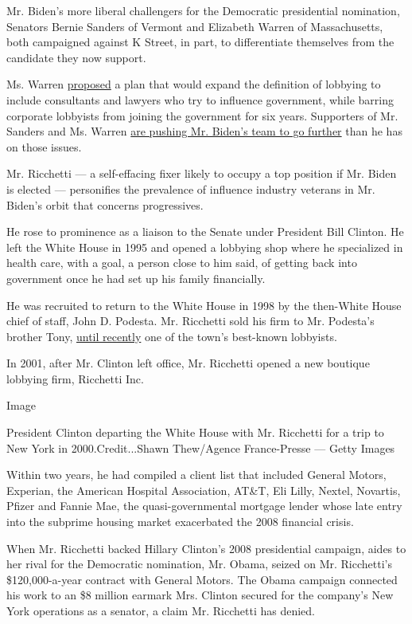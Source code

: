 Mr. Biden's more liberal challengers for the Democratic presidential
nomination, Senators Bernie Sanders of Vermont and Elizabeth Warren of
Massachusetts, both campaigned against K Street, in part, to
differentiate themselves from the candidate they now support.

Ms. Warren
\href{https://medium.com/@teamwarren/my-plan-to-end-washington-corruption-554c7f01aaa5}{proposed}
a plan that would expand the definition of lobbying to include
consultants and lawyers who try to influence government, while barring
corporate lobbyists from joining the government for six years.
Supporters of Mr. Sanders and Ms. Warren
\href{https://www.politico.com/news/2020/07/30/joe-biden-bernie-sanders-convention-389226}{are
pushing Mr. Biden's team to go further} than he has on those issues.

Mr. Ricchetti --- a self-effacing fixer likely to occupy a top position
if Mr. Biden is elected --- personifies the prevalence of influence
industry veterans in Mr. Biden's orbit that concerns progressives.

He rose to prominence as a liaison to the Senate under President Bill
Clinton. He left the White House in 1995 and opened a lobbying shop
where he specialized in health care, with a goal, a person close to him
said, of getting back into government once he had set up his family
financially.

He was recruited to return to the White House in 1998 by the then-White
House chief of staff, John D. Podesta. Mr. Ricchetti sold his firm to
Mr. Podesta's brother Tony,
\href{https://www.nytimes.com/2017/11/10/us/politics/john-tony-podesta-mueller-russia-investigation.html}{until
recently} one of the town's best-known lobbyists.

In 2001, after Mr. Clinton left office, Mr. Ricchetti opened a new
boutique lobbying firm, Ricchetti Inc.

Image

President Clinton departing the White House with Mr. Ricchetti for a
trip to New York in 2000.Credit...Shawn Thew/Agence France-Presse ---
Getty Images

Within two years, he had compiled a client list that included General
Motors, Experian, the American Hospital Association, AT\&T, Eli Lilly,
Nextel, Novartis, Pfizer and Fannie Mae, the quasi-governmental mortgage
lender whose late entry into the subprime housing market exacerbated the
2008 financial crisis.

When Mr. Ricchetti backed Hillary Clinton's 2008 presidential campaign,
aides to her rival for the Democratic nomination, Mr. Obama, seized on
Mr. Ricchetti's \$120,000-a-year contract with General Motors. The Obama
campaign connected his work to an \$8 million earmark Mrs. Clinton
secured for the company's New York operations as a senator, a claim Mr.
Ricchetti has denied.

